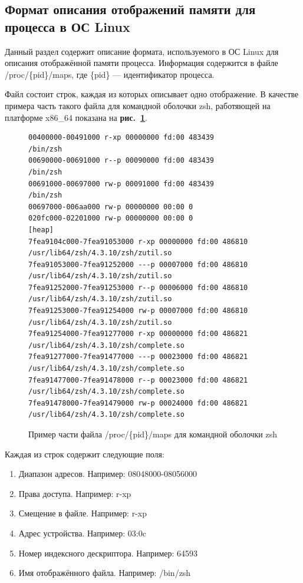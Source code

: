 \documentclass[a4paper,12pt,russian]{article}
\newcommand{\picref}[1]{\textbf{рис.~\ref{#1}}}
\newcommand{\code}[1]{\textsf{#1}}
\begin{document}
\subsection{Формат описания отображений памяти для процесса в ОС \code{Linux}}
Данный раздел содержит описание формата, используемого в ОС \code{Linux} для описания отображённой памяти процесса.
Информация содержится в файле \code{/proc/\{pid\}/maps}, где \code{\{pid\}} --- идентификатор процесса.

Файл состоит строк, каждая из которых описывает одно отображение.
В качестве примера часть такого файла для командной оболочки \code{zsh}, работяющей на платформе \code{x86\_64} показана на \picref{zsh_maps_lst}.

\begin{figure}[h]
\begin{lstlisting}[basicstyle=\tiny]
00400000-00491000 r-xp 00000000 fd:00 483439              /bin/zsh
00690000-00691000 r--p 00090000 fd:00 483439              /bin/zsh
00691000-00697000 rw-p 00091000 fd:00 483439              /bin/zsh
00697000-006aa000 rw-p 00000000 00:00 0
020fc000-02201000 rw-p 00000000 00:00 0                   [heap]
7fea9104c000-7fea91053000 r-xp 00000000 fd:00 486810      /usr/lib64/zsh/4.3.10/zsh/zutil.so
7fea91053000-7fea91252000 ---p 00007000 fd:00 486810      /usr/lib64/zsh/4.3.10/zsh/zutil.so
7fea91252000-7fea91253000 r--p 00006000 fd:00 486810      /usr/lib64/zsh/4.3.10/zsh/zutil.so
7fea91253000-7fea91254000 rw-p 00007000 fd:00 486810      /usr/lib64/zsh/4.3.10/zsh/zutil.so
7fea91254000-7fea91277000 r-xp 00000000 fd:00 486821      /usr/lib64/zsh/4.3.10/zsh/complete.so
7fea91277000-7fea91477000 ---p 00023000 fd:00 486821      /usr/lib64/zsh/4.3.10/zsh/complete.so
7fea91477000-7fea91478000 r--p 00023000 fd:00 486821      /usr/lib64/zsh/4.3.10/zsh/complete.so
7fea91478000-7fea91479000 rw-p 00024000 fd:00 486821      /usr/lib64/zsh/4.3.10/zsh/complete.so
\end{lstlisting}
\caption{Пример части файла \code{/proc/\{pid\}/maps} для командной оболочки \code{zsh}}
\label{zsh_maps_lst}
\end{figure}

Каждая из строк содержит следующие поля:
\begin{enumerate}
    \item Диапазон адресов. Например: \code{08048000-08056000}
    \item Права доступа. Например: \code{r-xp}
    \item Смещение в файле. Например: \code{r-xp}
    \item Адрес устройства. Например: \code{03:0c}
    \item Номер индексного дескриптора. Например: \code{64593}
    \item Имя отображённого файла. Например: \code{/bin/zsh}
\end{enumerate}
\end{document}
